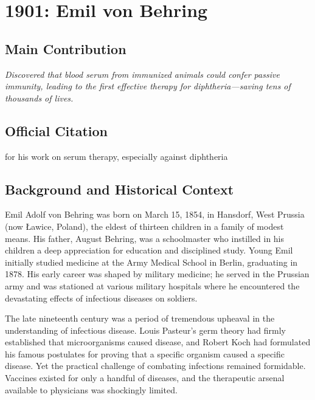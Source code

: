 \chapter[1901 --- Behring]{1901: Emil von Behring}
\label{ch:1901_emilvonbehring}

\section*{Main Contribution}

\textit{Discovered that blood serum from immunized animals could confer passive immunity, leading to the first effective therapy for diphtheria---saving tens of thousands of lives.}\cite{nobel-1901,lecture-1901}

\section{Official Citation}

for his work on serum therapy, especially against diphtheria

\section{Background and Historical Context}

Emil Adolf von Behring was born on March 15, 1854, in Hansdorf, West Prussia (now Ławice, Poland), the eldest of thirteen children in a family of modest means. His father, August Behring, was a schoolmaster who instilled in his children a deep appreciation for education and disciplined study. Young Emil initially studied medicine at the Army Medical School in Berlin, graduating in 1878. His early career was shaped by military medicine; he served in the Prussian army and was stationed at various military hospitals where he encountered the devastating effects of infectious diseases on soldiers.\cite{nobel-history}

The late nineteenth century was a period of tremendous upheaval in the understanding of infectious disease. Louis Pasteur's germ theory had firmly established that microorganisms caused disease, and Robert Koch had formulated his famous postulates for proving that a specific organism caused a specific disease. Yet the practical challenge of combating infections remained formidable. Vaccines existed for only a handful of diseases, and the therapeutic arsenal available to physicians was shockingly limited.

